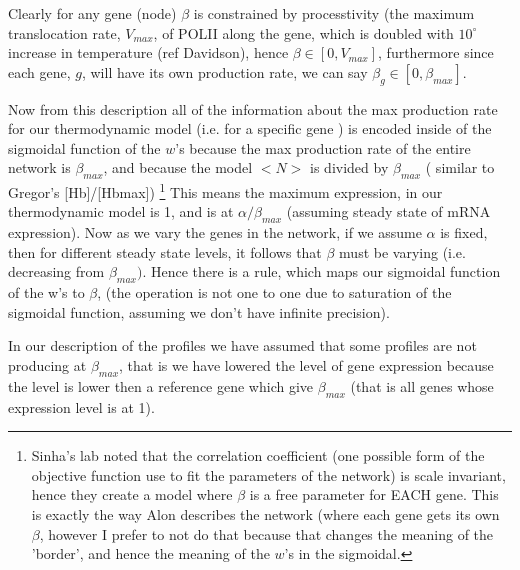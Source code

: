   Clearly for any gene (node) $\beta$ is constrained by processtivity (the maximum translocation rate, $V_{max}$, of POLII along the gene, which is doubled with $10^{\circ}$ increase in temperature (ref Davidson), hence $\beta \in [0,V_{max}]$, furthermore since each gene, $g$,  will have its own production rate, we can say $\beta_g \in [0,\beta_{max}]$.

  Now from this description all of the information about the max production rate for our thermodynamic model (i.e. for a specific gene ) is encoded inside of the sigmoidal function of the $w$'s because the max production rate of the entire network is $\beta_{max}$, and because the model $<N>$ is divided by $\beta_{max}$ ( similar to Gregor's [Hb]/[Hbmax]) \footnote[1]{Sinha's lab noted that the correlation coefficient (one possible form of the objective function use to fit the parameters of the network) is scale invariant, hence they create a model where $\beta$ is a free parameter for EACH gene.  This is exactly the way Alon describes the network (where each gene gets its own $\beta$, however I prefer to not do that because that changes the meaning of the 'border', and hence the meaning of the $w$'s in the sigmoidal.}  This means the maximum expression, in our thermodynamic model is 1, and is at  $\alpha/ \beta_{max}$ (assuming steady state of mRNA expression).  Now as we vary the genes in the network, if we assume $\alpha$ is fixed, then for different steady state levels, it follows that $\beta$ must be varying (i.e. decreasing from $\beta_{max})$.  Hence there is a rule, which maps our sigmoidal function of the w's to $\beta$,  (the operation is not one to one due to saturation of the sigmoidal function, assuming we don't have infinite precision).

In our description of the profiles we have assumed that some profiles are not producing at $\beta_{max}$, that is we have lowered the level of gene expression because the level is lower then a reference gene which give $\beta_{max}$ (that is all genes whose expression level is at 1).

